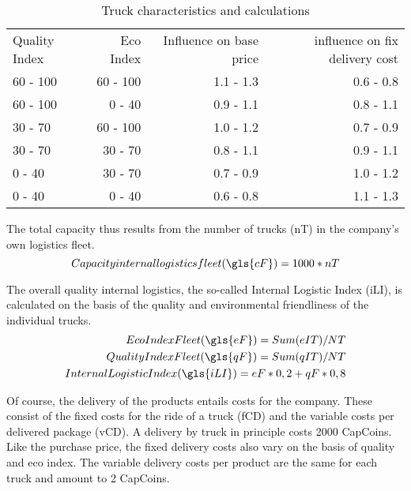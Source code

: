 \begin{table}[ht]
    \centering
    \begin{tabular}{|l|r|r|r|}
    \hline
    Quality Index & Eco Index & Influence on base price & influence on fix delivery cost \\
    60 - 100      & 60 - 100   & 1.1 - 1.3   & 0.6 - 0.8       \\
    60 - 100      & 0 - 40     & 0.9 - 1.1   & 0.8 - 1.1       \\
    30 - 70       & 60 - 100   & 1.0 - 1.2   & 0.7 - 0.9       \\
    30 - 70       & 30 - 70    & 0.8 - 1.1   & 0.9 - 1.1       \\
    0 - 40        & 30 - 70    & 0.7 - 0.9   & 1.0 - 1.2       \\
    0 - 40        & 0 - 40     & 0.6 - 0.8   & 1.1 - 1.3       \\
    \hline
    \end{tabular}
    \caption{Truck characteristics and calculations}
    \label{Truck_characteristics}
\end{table}

The total capacity thus results from the number of trucks (\gls{nT}) in the company's own logistics fleet. 
\begin{equation}
    Capacity internal logistics fleet (\gls{cF}) = 1000 * nT
\end{equation}

The overall quality internal logistics, the so-called Internal Logistic Index (\gls{iLI}), is calculated on the basis of the quality and environmental friendliness of the individual trucks.  
\begin{equation}
\begin{aligned}
    Eco Index Fleet (\gls{eF}) = Sum (eIT) / NT \\
    Quality Index Fleet (\gls{qF}) = Sum (qIT) / NT \\
    Internal Logistic Index (\gls{iLI}) = eF * 0,2 + qF * 0,8 \\
\end{aligned}
\end{equation}

Of course, the delivery of the products entails costs for the company. These consist of the fixed costs for the ride of a truck (\gls{fCD}) and the variable costs per delivered package (\gls{vCD}). 
A delivery by truck in principle costs 2000 CapCoins. Like the purchase price, the fixed delivery costs also vary on the basis of quality and eco index. The variable delivery costs per product are the same for each truck and amount to 2 CapCoins.

